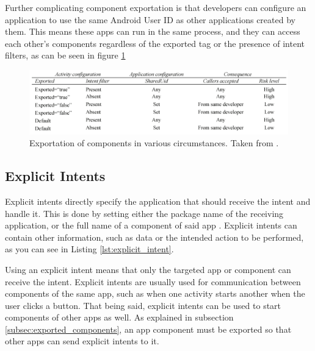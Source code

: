     Further complicating component exportation is that developers can configure an application to use the same Android User ID as other applications created by them. This means these apps can run in the same process, and they can access each other’s components regardless of the exported tag or the presence of intent filters, as can be seen in figure \ref{fig:component_exportation}
    
    \begin{figure}[h]
        \centering
        \includegraphics[width=1\textwidth]{graphics/component exportation.PNG}
        \caption{Exportation of components in various circumstances. Taken from \cite{2013_permission_leaks_study}.}
        \label{fig:component_exportation}
    \end{figure}
    
    \subsection{Explicit Intents}
        \label{sec:explicit_intents}
        
    Explicit intents directly specify the application that should receive the intent and handle it. This is done by setting either the package name of the receiving application, or the full name of a component of said app \cite{intents_and_intent_filters}. Explicit intents can contain other information, such as data or the intended action to be performed, as you can see in Listing \ref{lst:explicit_intent}.
    
    Using an explicit intent means that only the targeted app or component can receive the intent. Explicit intents are usually used for communication between components of the same app, such as when one activity starts another when the user clicks a button. That being said, explicit intents can be used to start components of other apps as well. As explained in subsection \ref{subsec:exported_components}, an app component must be exported so that other apps can send explicit intents to it.
    
    
    
